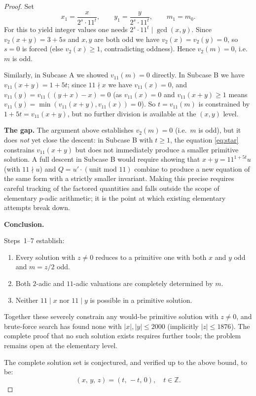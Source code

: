 \documentclass[12pt]{article}
\theoremstyle{definition}
\begin{document}
\begin{proof}
Set
\[
    x_1 = \frac{x}{2^s \cdot 11^t}, \qquad y_1 = \frac{y}{2^s \cdot 11^t},
    \qquad m_1 = m_0.
\]
For this to yield integer values one needs $2^s \cdot 11^t \mid \gcd(x, y)$. Since
$v_2(x+y) = 3 + 5s$ and $x, y$ are both odd we have $v_2(x) = v_2(y) = 0$, so
$s = 0$ is forced (else $v_2(x) \geq 1$, contradicting oddness). Hence $v_2(m) = 0$,
i.e.\ $m$ is odd.

Similarly, in Subcase A we showed $v_{11}(m) = 0$ directly. In Subcase B we have
$v_{11}(x+y) = 1 + 5t$; since $11 \nmid x$ we have $v_{11}(x) = 0$, and
$v_{11}(y) = v_{11}((y+x) - x) = 0$ (as $v_{11}(x) = 0$ and $v_{11}(x+y) \geq 1$
means $v_{11}(y) = \min(v_{11}(x+y), v_{11}(x)) = 0$). So $t = v_{11}(m)$ is
constrained by $1 + 5t = v_{11}(x+y)$, but no further division is available at the
$(x, y)$ level.

\medskip

\textbf{The gap.} The argument above establishes $v_2(m) = 0$ (i.e.\ $m$ is odd),
but it does \emph{not} yet close the descent: in Subcase B with $t \geq 1$, the
equation \eqref{eq:star} constrains $v_{11}(x+y)$ but does not immediately produce
a smaller primitive solution. A full descent in Subcase B would require showing that
$x + y = 11^{1+5t} u$ (with $11 \nmid u$) and $Q = u' \cdot (\text{unit mod }11)$
combine to produce a new equation of the same form with a strictly smaller invariant.
Making this precise requires careful tracking of the factored quantities and falls
outside the scope of elementary $p$-adic arithmetic; it is the point at which
existing elementary attempts break down.

\medskip

\textbf{Conclusion.}

Steps~1--7 establish:
\begin{enumerate}
    \item Every solution with $z \neq 0$ reduces to a primitive one with both $x$
          and $y$ odd and $m = z/2$ odd.
    \item Both $2$-adic and $11$-adic valuations are completely determined by $m$.
    \item Neither $11 \mid x$ nor $11 \mid y$ is possible in a primitive solution.
\end{enumerate}
Together these severely constrain any would-be primitive solution with $z \neq 0$,
and brute-force search has found none with $|x|, |y| \leq 2000$ (implicitly
$|z| \leq 1876$). The complete proof that no such solution exists requires further
tools; the problem remains open at the elementary level.

The complete solution set is conjectured, and verified up to the above bound, to be:
\[
    \boxed{(x,\, y,\, z) = (t,\,-t,\,0), \quad t \in \mathbb{Z}.}
\]
\end{proof}
\end{document}
